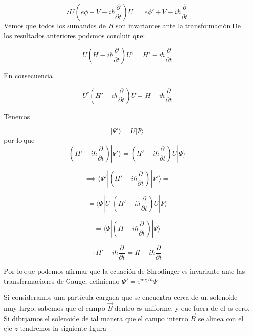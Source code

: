 \documentclass[12pt]{article}
\begin{document}
\begin{equation}
\therefore \boxed{U(e\phi+V-i\hbar\frac{\partial}{\partial t})U^{\dag}=e\phi'+V-i\hbar\frac{\partial}{\partial t}}
\end{equation}
Vemos que todos los sumandos de $H$ son invariantes ante la transformación
De los resultados anteriores podemos concluir que:

\begin{equation}
U(H-i\hbar\frac{\partial}{\partial t})U^{\dag}=H'-i\hbar\frac{\partial}{\partial t}
\end{equation}

 En consecuencia 
 
\begin{equation}
U^{\dag}(H'-i\hbar\frac{\partial}{\partial t})U=H-i\hbar\frac{\partial}{\partial t}
\end{equation}

Tenemos 

\begin{equation}
|\Psi'\rangle=U|\Psi\rangle
\end{equation}
por lo que
\begin{equation}
(H'-i\hbar\frac{\partial}{\partial t})|\Psi'\rangle=(H'-i\hbar\frac{\partial}{\partial t})U|\Psi\rangle
\end{equation}

\begin{equation}
\implies
\langle\Psi'|(H'-i\hbar\frac{\partial}{\partial t})|\Psi'\rangle = 
\end{equation}

\begin{equation}
= \langle\Psi|U^{\dag}(H'-i\hbar\frac{\partial}{\partial t})U|\Psi\rangle
\end{equation}

\begin{equation}
=\langle\Psi|(H-i\hbar\frac{\partial}{\partial t})|\Psi\rangle
\end{equation}


\begin{equation}
\therefore
H'-i\hbar\frac{\partial}{\partial t} = H-i\hbar\frac{\partial}{\partial t}
\end{equation}

Por lo que podemos afirmar que la ecuación de Shrodinger es invariante ante las transformaciones de Gauge, definiendo $\Psi'=e^{ie\chi/\hbar}\Psi$ 


Si consideramos una partícula cargada que se encuentra cerca de un solenoide muy largo, sabemos que el campo $\vec{B}$ dentro es uniforme, y que fuera de el es cero. Si dibujamos el solenoide de tal manera que el campo interno $\vec{B}$ se alinea con el eje $z$ tendremos la siguiente figura
\end{document}
